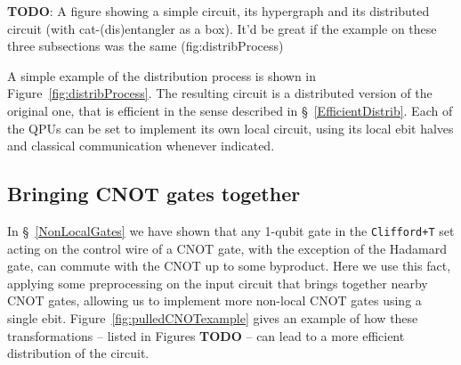 \begin{comment}
\begin{algorithm}[caption={Algorithm for distributing a circuit using an assignment \(qpuOf \colon \mathbb{N} \to \mathbb{N}\) which indicates the QPU number of the given wire},label={code:distribution}]
input: circuit, $qpuOf$
output: distributed
begin
  distributed $\gets$ $emptyCircuit$
  foreach wire in circuit do
    thisQPU = $qpuOf$(wire)
    activeConnections $\gets$ $\varnothing$
    foreach gate in wire do
      if gate == CNOT and $controlOf$(gate) == wire then
        targetQPU = $qpuOf$($targetOf$(gate))
        if targetQPU == thisQPU then
          distributed.$addCNOTAt$(wire,target)
        else
          ebit $\gets$ activeConnections.$at$(targetQPU)
          if ebit == null then
            ebit $\gets$ $distillEbit$(thisQPU, targetQPU)
            distributed.$addCatEntangler$(ebit, wire)
            activeConnections.$at$(targetQPU) $\gets$ ebit
          distributed.$addCNOTAt$(ebit,$targetOf$(gate))
      else
        distributed.$addGateAt$(gate,wire)
end
\end{algorithm}
\end{comment}


\textbf{TODO}: A figure showing a simple circuit, its hypergraph and its distributed circuit (with cat-(dis)entangler as a box). It'd be great if the example on these three subsections was the same (fig:distribProcess)

A simple example of the distribution process is shown in Figure~\ref{fig:distribProcess}. The resulting circuit is a distributed version of the original one, that is efficient in the sense described in \S~\ref{EfficientDistrib}. Each of the QPUs can be set to implement its own local circuit, using its local ebit halves and classical communication whenever indicated.


\subsection{Bringing CNOT gates together}
\label{pullCNOTs}

In \S~\ref{NonLocalGates} we have shown that any 1-qubit gate in the \texttt{Clifford+T} set acting on the control wire of a CNOT gate, with the exception of the Hadamard gate, can commute with the CNOT up to some byproduct. Here we use this fact, applying some preprocessing on the input circuit that brings together nearby CNOT gates, allowing us to implement more non-local CNOT gates using a single ebit. Figure~\ref{fig:pulledCNOTexample} gives an example of how these transformations -- listed in Figures \textbf{TODO} -- can lead to a more efficient distribution of the circuit.

